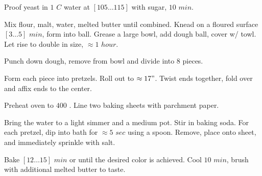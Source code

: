 \begin{preparation}
\item Proof yeast in $1$ $C$ water at $[105 \dots 115]$ \Fahrenheit with sugar, $10$ $min$.
\item Mix flour, malt, water, melted butter until combined.
	Knead on a floured surface $[3 \dots 5]$ $min$, form into ball.
	Grease a large bowl, add dough ball, cover w/ towl.
	Let rise to double in size, $\approx 1$ $hour$.
\item Punch down dough, remove from bowl and divide into 8 pieces.
\item Form each piece into pretzels.
	Roll out to $\approx 17"$.
	Twist ends together, fold over and affix ends to the center.
\item Preheat oven to $400$ \Fahrenheit. Line two baking sheets with parchment paper.
\item Bring the water to a light simmer and a medium pot.
	Stir in baking soda.
	For each pretzel, dip into bath for $\approx 5$ $sec$ using a spoon.
	Remove, place onto sheet, and immediately sprinkle with salt.
\item Bake $[12 \dots 15]$ $min$ or until the desired color is achieved.
	Cool $10$ $min$, brush with additional melted butter to taste.
\end{preparation}

\recipeend

